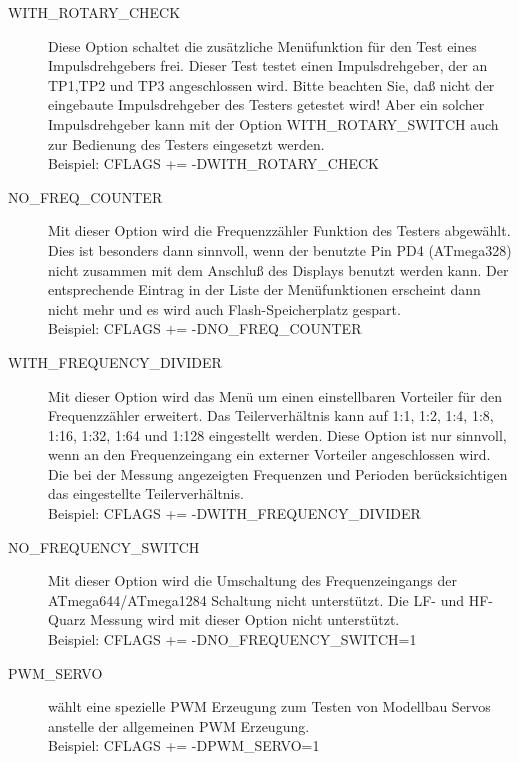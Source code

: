 \begin{description}
 \item[WITH\_ROTARY\_CHECK]
Diese Option schaltet die zusätzliche Menüfunktion für den Test eines Impulsdrehgebers frei.
Dieser Test testet einen Impulsdrehgeber, der an TP1,TP2 und TP3 angeschlossen wird.
Bitte beachten Sie, daß nicht der eingebaute Impulsdrehgeber des Testers getestet wird!
Aber ein solcher Impulsdrehgeber kann mit der Option WITH\_ROTARY\_SWITCH auch zur Bedienung des Testers eingesetzt werden.\\
Beispiel: CFLAGS += -DWITH\_ROTARY\_CHECK

 \item[NO\_FREQ\_COUNTER]
Mit dieser Option wird die Frequenzzähler Funktion des Testers abgewählt.
Dies ist besonders dann sinnvoll, wenn der benutzte Pin PD4 (ATmega328) nicht zusammen mit
dem Anschluß des Displays benutzt werden kann.
Der entsprechende Eintrag in der Liste der Menüfunktionen erscheint dann nicht mehr und es
wird auch Flash-Speicherplatz gespart.\\
Beispiel: CFLAGS += -DNO\_FREQ\_COUNTER

 \item[WITH\_FREQUENCY\_DIVIDER]
Mit dieser Option wird das Menü um einen einstellbaren Vorteiler für den Frequenzzähler erweitert.
Das Teilerverhältnis kann auf 1:1, 1:2, 1:4, 1:8, 1:16, 1:32, 1:64 und 1:128 eingestellt werden.
Diese Option ist nur sinnvoll, wenn an den Frequenzeingang ein externer Vorteiler angeschlossen wird.
Die bei der Messung angezeigten Frequenzen und Perioden berücksichtigen das eingestellte Teilerverhältnis.\\
Beispiel: CFLAGS += -DWITH\_FREQUENCY\_DIVIDER

 \item[NO\_FREQUENCY\_SWITCH]
Mit dieser Option wird die Umschaltung des Frequenzeingangs der ATmega644/ATmega1284 Schaltung nicht unterstützt.
Die LF- und HF-Quarz Messung wird mit dieser Option nicht unterstützt.\\
Beispiel: CFLAGS += -DNO\_FREQUENCY\_SWITCH=1

\item[PWM\_SERVO] 
wählt eine spezielle PWM Erzeugung zum Testen von Modellbau Servos anstelle der allgemeinen PWM Erzeugung.\\
Beispiel: CFLAGS += -DPWM\_SERVO=1


\end{description}
